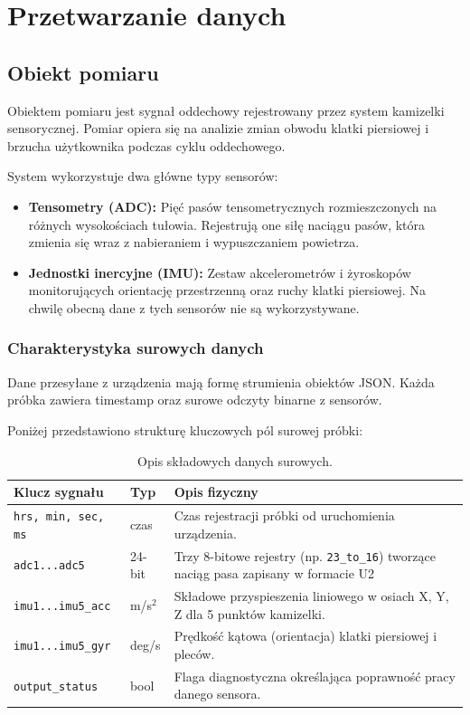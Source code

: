 \chapter{Przetwarzanie danych}

\section{Obiekt pomiaru}
\label{obiekt_pomiaru}

Obiektem pomiaru jest sygnał oddechowy rejestrowany przez system kamizelki
sensorycznej. Pomiar opiera się na analizie zmian obwodu klatki piersiowej 
i brzucha użytkownika podczas cyklu oddechowego. 

System wykorzystuje dwa główne typy sensorów:
\begin{itemize}
    \item \textbf{Tensometry (ADC):} 
        Pięć pasów tensometrycznych rozmieszczonych na różnych wysokościach tułowia.
        Rejestrują one siłę naciągu pasów, która zmienia się wraz z nabieraniem
        i wypuszczaniem powietrza.
    \item \textbf{Jednostki inercyjne (IMU):} 
        Zestaw akcelerometrów i żyroskopów monitorujących orientację przestrzenną oraz
        ruchy klatki piersiowej. Na chwilę obecną dane z tych sensorów nie są wykorzystywane.
\end{itemize}

\subsection{Charakterystyka surowych danych}
\label{raw_data}
Dane przesyłane z urządzenia mają formę strumienia obiektów JSON. Każda próbka zawiera timestamp 
oraz surowe odczyty binarne z sensorów.

Poniżej przedstawiono strukturę kluczowych pól surowej próbki:

\begin{table}[H]
\centering
\caption{Opis składowych danych surowych.}
\begin{tabular}{|l|l|p{8cm}|}
\hline
\textbf{Klucz sygnału} & \textbf{Typ} & \textbf{Opis fizyczny} \\ \hline
\texttt{hrs, min, sec, ms} & czas & Czas rejestracji próbki od uruchomienia urządzenia. \\ \hline
\texttt{adc1...adc5} & 24-bit & Trzy 8-bitowe rejestry (np. \texttt{23\_to\_16}) tworzące naciąg 
pasa zapisany w formacie U2\\ \hline
\texttt{imu1...imu5\_acc} & m/s$^2$ & Składowe przyspieszenia liniowego w osiach X, Y, Z dla 5 punktów kamizelki. \\ \hline
\texttt{imu1...imu5\_gyr} & deg/s & Prędkość kątowa (orientacja) klatki piersiowej i pleców. \\ \hline
\texttt{output\_status} & bool & Flaga diagnostyczna określająca poprawność pracy danego sensora. \\ \hline
\end{tabular}
\end{table}

